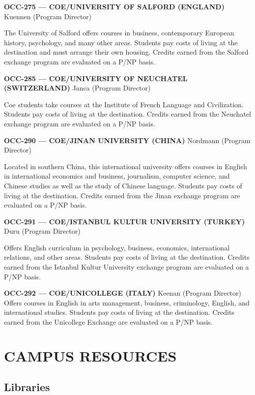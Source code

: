 \documentclass[
  letterpaper,
]{scrbook}
\renewcommand{\part}[1]{\addcontentsline{toc}{part}{#1}}
\begin{document}
\textbf{OCC-275 --- COE/UNIVERSITY OF SALFORD (ENGLAND)} Kuennen
(Program Director)

The University of Salford offers courses in business, contemporary
European history, psychology, and many other areas. Students pay costs
of living at the destination and must arrange their own housing. Credits
earned from the Salford exchange program are evaluated on a P/NP basis.

\textbf{OCC-285 --- COE/UNIVERSITY OF NEUCHATEL (SWITZERLAND)} Janca
(Program Director)

Coe students take courses at the Institute of French Language and
Civilization. Students pay costs of living at the destination. Credits
earned from the Neuchatel exchange program are evaluated on a P/NP
basis.

\textbf{OCC-290 --- COE/JINAN UNIVERSITY (CHINA)} Nordmann (Program
Director)

Located in southern China, this international university offers courses
in English in international economics and business, journalism, computer
science, and Chinese studies as well as the study of Chinese language.
Students pay costs of living at the destination. Credits earned from the
Jinan exchange program are evaluated on a P/NP basis.

\textbf{OCC-291 --- COE/ISTANBUL KULTUR UNIVERSITY (TURKEY)} Duru
(Program Director)

Offers English curriculum in psychology, business, economics,
international relations, and other areas. Students pay costs of living
at the destination. Credits earned from the Istanbul Kultur University
exchange program are evaluated on a P/NP basis.

\textbf{OCC-292 --- COE/UNICOLLEGE (ITALY)} Keenan (Program Director)
Offers courses in English in arts management, business, criminology,
English, and international studies. Students pay costs of living at the
destination. Credits earned from the Unicollege Exchange are evaluated
on a P/NP basis.

\part{CAMPUS RESOURCES}

\chapter{CAMPUS RESOURCES}\label{campus-resources-1}

\section{Libraries}\label{libraries}
\end{document}
